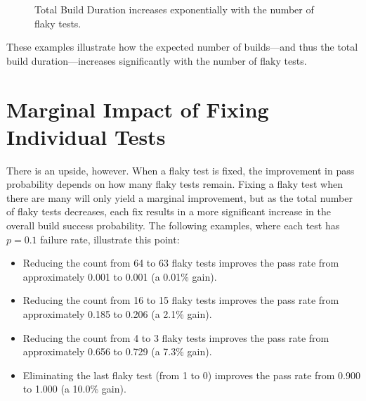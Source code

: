 \documentclass[letterpaper]{article}
\begin{document}
\begin{figure}[ht!]
    \centering
    \caption{Total Build Duration increases exponentially with the number of flaky tests.}
\end{figure}

These examples illustrate how the expected number of builds—and thus the total build duration—increases significantly with the number of flaky tests.

\section*{Marginal Impact of Fixing Individual Tests}

There is an upside, however. When a flaky test is fixed, the improvement in pass probability depends on how many flaky tests remain. Fixing a flaky test when there are many will only yield a marginal improvement, but as the total number of flaky tests decreases, each fix results in a more significant increase in the overall build success probability. The following examples, where each test has \( p = 0.1 \) failure rate, illustrate this point:

\begin{itemize}
    \item Reducing the count from 64 to 63 flaky tests improves the pass rate from approximately 0.001 to 0.001 (a 0.01\% gain).
    \item Reducing the count from 16 to 15 flaky tests improves the pass rate from approximately 0.185 to 0.206 (a 2.1\% gain).
    \item Reducing the count from 4 to 3 flaky tests improves the pass rate from approximately 0.656 to 0.729 (a 7.3\% gain).
    \item Eliminating the last flaky test (from 1 to 0) improves the pass rate from 0.900 to 1.000 (a 10.0\% gain).
\end{itemize}
\end{document}
